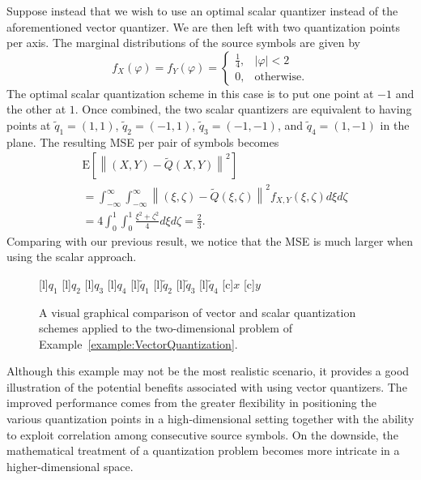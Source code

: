 \begin{example}
Suppose instead that we wish to use an optimal scalar quantizer instead of the aforementioned vector quantizer.
We are then left with two quantization points per axis.
The marginal distributions of the source symbols are given by
\begin{equation*}
f_X (\varphi) = f_Y (\varphi)
= \begin{cases} \frac{1}{4}, & |\varphi| < 2 \\
0, & \text{otherwise} . \end{cases}
\end{equation*}
The optimal scalar quantization scheme in this case is to put one point at $-1$ and the other at $1$.
Once combined, the two scalar quantizers are equivalent to having points at $\tilde{q}_1 = (1,1)$, $\tilde{q}_2 = (-1,1)$, $\tilde{q}_3 = (-1,-1)$, and $\tilde{q}_4 = (1,-1)$ in the plane.
The resulting MSE per pair of symbols becomes
\begin{equation*}
\begin{split}
&\mathrm{E} \left[ \left\| (X,Y) - \tilde{Q}(X,Y) \right\|^2 \right] \\
&= \int_{-\infty}^{\infty} \int_{-\infty}^{\infty}
\left\| (\xi, \zeta) - \tilde{Q}(\xi, \zeta) \right\|^2 f_{X,Y}(\xi,\zeta) d\xi d\zeta \\
&= 4 \int_0^1 \int_0^1 \frac{\xi^2 + \zeta^2}{4} d\xi d\zeta
= \frac{2}{3} .
\end{split}
\end{equation*}
Comparing with our previous result, we notice that the MSE is much larger when using the scalar approach.
\begin{figure}[htbp]
\begin{center}
\begin{psfrags}
[l]{$q_1$}
[l]{$q_2$}
[l]{$q_3$}
[l]{$q_4$}
[l]{$\tilde{q}_1$}
[l]{$\tilde{q}_2$}
[l]{$\tilde{q}_3$}
[l]{$\tilde{q}_4$}
[c]{$x$}
[c]{$y$}
\end{psfrags}
\caption{A visual graphical comparison of vector and scalar quantization schemes applied to the two-dimensional problem of Example~\ref{example:VectorQuantization}.}
\label{figure:VectorQuantizer}
\end{center}
\end{figure}
\end{example}

Although this example may not be the most realistic scenario, it provides a good illustration of the potential benefits associated with using vector quantizers.
The improved performance comes from the greater flexibility in positioning the various quantization points in a high-dimensional setting together with the ability to exploit correlation among consecutive source symbols.
On the downside, the mathematical treatment of a quantization problem becomes more intricate in a higher-dimensional space.


